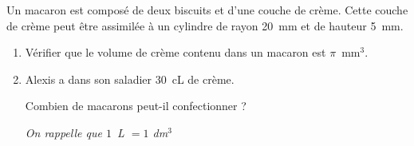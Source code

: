 
\medskip

Un macaron est composé de deux biscuits et d'une couche de crème. Cette
couche de crème peut être assimilée à un cylindre de rayon 20~mm et de
hauteur 5~mm.

\medskip

\begin{enumerate}
\item Vérifier que le volume de crème contenu dans un macaron est $\pi$~mm$^3$.
 
\item Alexis a dans son saladier 30~cL de crème.

Combien de macarons peut-il confectionner ?

\emph{On rappelle que $1$~{\rm L} $= 1$ {\rm dm}}\boldmath$^3$\unboldmath
\end{enumerate}

\bigskip


